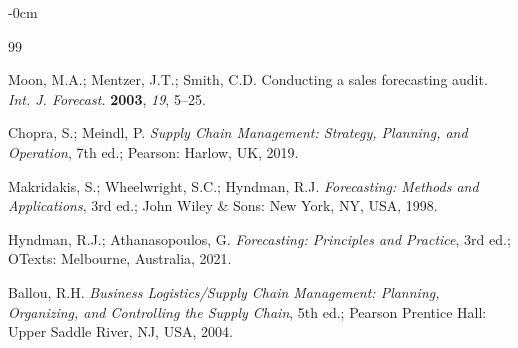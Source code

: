 \documentclass[forecasting,article,submit,pdftex,moreauthors]{Definitions/mdpi}
\begin{document}
\begin{adjustwidth}{-\extralength}{0cm}



% 


\begin{thebibliography}{99}

Moon, M.A.; Mentzer, J.T.; Smith, C.D. Conducting a sales forecasting audit. \textit{Int. J. Forecast.} \textbf{2003}, \textit{19}, 5--25.

Chopra, S.; Meindl, P. \textit{Supply Chain Management: Strategy, Planning, and Operation}, 7th ed.; Pearson: Harlow, UK, 2019.

Makridakis, S.; Wheelwright, S.C.; Hyndman, R.J. \textit{Forecasting: Methods and Applications}, 3rd ed.; John Wiley \& Sons: New York, NY, USA, 1998.

Hyndman, R.J.; Athanasopoulos, G. \textit{Forecasting: Principles and Practice}, 3rd ed.; OTexts: Melbourne, Australia, 2021.

Ballou, R.H. \textit{Business Logistics/Supply Chain Management: Planning, Organizing, and Controlling the Supply Chain}, 5th ed.; Pearson Prentice Hall: Upper Saddle River, NJ, USA, 2004.


\end{thebibliography}
\end{adjustwidth}
\end{document}
